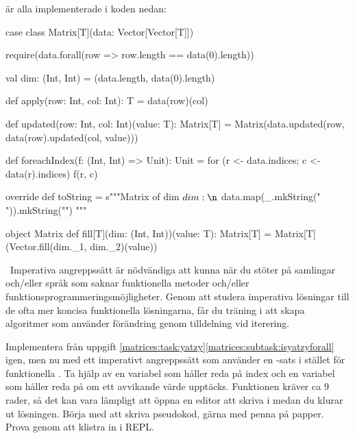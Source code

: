 \noindent \SubtaskSolved \SubtaskSolved \SubtaskSolved \SubtaskSolved \SubtaskSolved är alla implementerade i koden nedan: \vspace{-0.5em}
\begin{CodeSmall}
case class Matrix[T](data: Vector[Vector[T]]) {
  require(data.forall(row => row.length == data(0).length))

  val dim: (Int, Int) = (data.length, data(0).length)

  def apply(row: Int, col: Int): T = data(row)(col)

  def updated(row: Int, col: Int)(value: T): Matrix[T] =
    Matrix(data.updated(row, data(row).updated(col, value)))

  def foreachIndex(f: (Int, Int) => Unit): Unit =
    for (r <- data.indices; c <- data(r).indices) f(r, c)

  override def toString =
    s"""Matrix of dim $dim:\n${ data.map(_.mkString(" ")).mkString("\n") }"""
}
object Matrix {
  def fill[T](dim: (Int, Int))(value: T): Matrix[T] =
    Matrix[T](Vector.fill(dim._1, dim._2)(value))
}
\end{CodeSmall}

\QUESTEND


\clearpage

\ExtraTasks %



\QUESTBEGIN

\Task  \what~Imperativa angreppssätt är nödvändiga att kunna när du stöter på samlingar och/eller språk som saknar funktionella metoder och/eller funktionsprogrammeringsmöjligheter. Genom att studera imperativa lösningar till de ofta mer koncisa funktionella lösningarna, får du träning i att skapa algoritmer som använder förändring genom tilldelning vid iterering.

\Subtask Implementera  från uppgift \ref{matrices:task:yatzy}\ref{matrices:subtask:isyatzyforall} igen, men nu med ett imperativt angreppssätt som använder en -sats i stället för funktionella . Ta hjälp av en variabel  som håller reda på index och en variabel  som håller reda på om ett avvikande värde upptäcks. Funktionen kräver ca 9 rader, så det kan vara lämpligt att öppna en editor att skriva i medan du klurar ut lösningen. Börja med att skriva pseudokod, gärna med penna på papper. Prova genom att klistra in i REPL.

